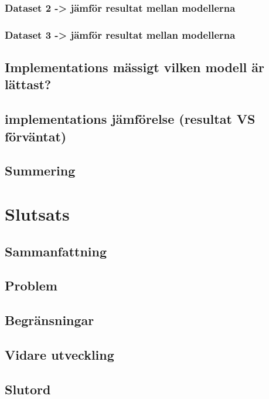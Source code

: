\documentclass{kaumasters} %
\begin{document}
\subsection{Dataset 2 -> jämför resultat mellan modellerna}
\subsection{Dataset 3 -> jämför resultat mellan modellerna}
\section{Implementations mässigt vilken modell är lättast?}
\section{implementations jämförelse (resultat VS förväntat)}
\section{Summering}

\newpage

\chapter{Slutsats}
\section{Sammanfattning}
\section{Problem}
\section{Begränsningar}
\section{Vidare utveckling}
\section{Slutord}

\restoregeometry%
\end{document}
